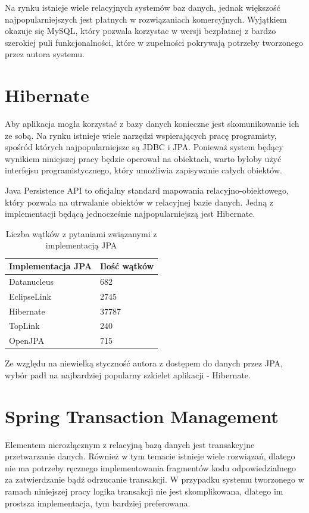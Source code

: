 Na rynku istnieje wiele relacyjnych systemów baz danych, jednak większość najpopularniejszych jest płatnych w rozwiązaniach komercyjnych. Wyjątkiem okazuje się MySQL, który pozwala korzystac w wersji bezpłatnej z bardzo szerokiej puli funkcjonalności, które w zupełności pokrywają potrzeby tworzonego przez autora systemu.

\section{Hibernate}
Aby aplikacja mogła korzystać z bazy danych konieczne jest skomunikowanie ich ze sobą. Na rynku istnieje wiele narzędzi wspierających pracę programisty, spośród których najpopularniejsze są JDBC i JPA. Ponieważ system będący wynikiem niniejszej pracy będzie operował na obiektach, warto byłoby użyć interfejsu programistycznego, który umożliwia zapisywanie całych obiektów.

Java Persistence API to oficjalny standard mapowania relacyjno-obiektowego, który pozwala na utrwalanie obiektów w relacyjnej bazie danych. Jedną z implementacji będącą jednocześnie najpopularniejszą jest Hibernate.

\begin{table}[H]
\caption{Liczba wątków z pytaniami związanymi z implementacją JPA}
\label{jpaImplementations}
\begin{center}
\begin{tabular}{|l|l|}
\multicolumn{1}{c}{Implementacja JPA} & \multicolumn{1}{c}{Ilość wątków} \\ \hline
Datanucleus & 682 \\ \hline
EclipseLink & 2745 \\ \hline
Hibernate & 37787 \\ \hline
TopLink & 240 \\ \hline
OpenJPA & 715 \\ \hline
\end{tabular} 
\end{center}
\end{table} 

Ze względu na niewielką styczność autora z dostępem do danych przez JPA, wybór padł na najbardziej popularny szkielet aplikacji - Hibernate.

\newpage
\section{Spring Transaction Management}
Elementem nierozłącznym z relacyjną bazą danych jest transakcyjne przetwarzanie danych. Również w tym temacie istnieje wiele rozwiązań, dlatego nie ma potrzeby ręcznego implementowania fragmentów kodu odpowiedzialnego za zatwierdzanie bądź odrzucanie transakcji. W przypadku systemu tworzonego w ramach niniejszej pracy logika transakcji nie jest skomplikowana, dlatego im prostsza implementacja, tym bardziej preferowana.

